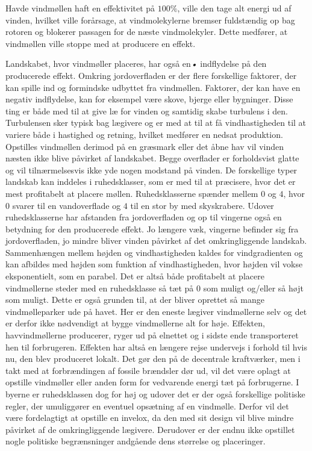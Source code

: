 Havde vindmøllen haft en effektivitet på $100 \%$, ville den tage alt energi ud af vinden, hvilket ville forårsage, at vindmolekylerne bremser fuldstændig op bag rotoren og blokerer passagen for de næste vindmolekyler. Dette medfører, at vindmøllen ville stoppe med at producere en effekt. 

Landskabet, hvor vindmøller placeres, har også en\textsl{•} indflydelse på den producerede effekt. Omkring jordoverfladen er der flere forskellige faktorer, der kan spille ind og formindske udbyttet fra vindmøllen. Faktorer, der kan have en negativ indflydelse, kan for eksempel være skove, bjerge eller bygninger. Disse ting er både med til at give læ for vinden og samtidig skabe turbulens i den. Turbulensen sker typisk bag lægivere og er med at til at få vindhastigheden til at variere både i hastighed og retning, hvilket medfører en nedsat produktion. 
Opstilles vindmøllen derimod på en græsmark eller det åbne hav vil vinden næsten ikke blive påvirket af landskabet. Begge overflader er forholdsvist glatte og vil tilnærmelsesvis ikke yde nogen modstand på vinden. 
De forskellige typer landskab kan inddeles i ruhedsklasser, som er med til at præcisere, hvor det er mest profitabelt at placere møllen. Ruhedsklasserne spænder mellem $0$ og $4$, hvor $0$ svarer til en vandoverflade og $4$ til en stor by med skyskrabere. 
Udover ruhedsklasserne har afstanden fra jordoverfladen og op til vingerne også en betydning for den producerede effekt. Jo længere væk, vingerne befinder sig fra jordoverfladen, jo mindre bliver vinden påvirket af det omkringliggende landskab. Sammenhængen mellem højden og vindhastigheden kaldes for vindgradienten og kan afbildes med højden som funktion af vindhastigheden, hvor højden vil vokse eksponentielt, som en parabel. 
Det er altså både profitabelt at placere vindmøllerne steder med en ruhedsklasse så tæt på $0$ som muligt og/eller så højt som muligt. Dette er også grunden til, at der bliver oprettet så mange vindmølleparker ude på havet. Her er den eneste lægiver vindmøllerne selv og det er derfor ikke nødvendigt at bygge vindmøllerne alt for høje. 
Effekten, havvindmøllerne producerer, ryger ud på elnettet og i sidste ende transporteret hen til forbrugeren. Effekten har altså en længere rejse undervejs i forhold til hvis nu, den blev produceret lokalt. Det gør den på de decentrale kraftværker, men i takt med at forbrændingen af fossile brændsler dør ud, vil det være oplagt at opstille vindmøller eller anden form for vedvarende energi tæt på forbrugerne. I byerne er ruhedsklassen dog for høj og udover det er der også forskellige politiske regler, der umuliggører en eventuel opsætning af en vindmølle. 
Derfor vil det være fordelagtigt at opstille en invelox, da den med sit design vil blive mindre påvirket af de omkringliggende lægivere. Derudover er der endnu ikke opstillet nogle politiske begrænsninger andgående dens størrelse og placeringer. 


